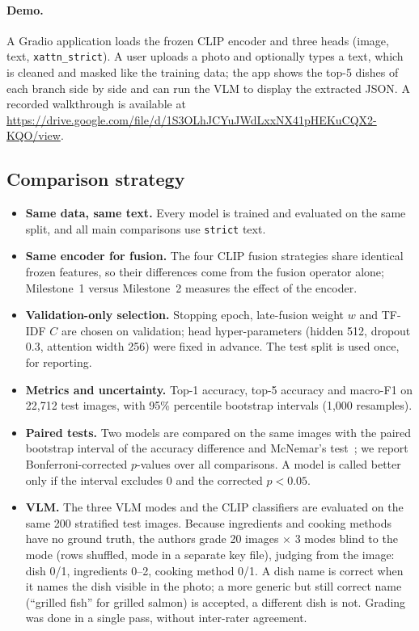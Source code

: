 \documentclass[11pt,a4paper]{article}
\begin{document}
\paragraph{Demo.}
A Gradio application loads the frozen CLIP encoder and three heads (image, text, \texttt{xattn\_strict}). A user
uploads a photo and optionally types a text, which is cleaned and masked like the training data; the app shows the
top-5 dishes of each branch side by side and can run the VLM to display the extracted JSON. A recorded walkthrough
is available at \url{https://drive.google.com/file/d/1S3OLhJCYuJWdLxxNX41pHEKuCQX2-KQO/view}.

\subsection{Comparison strategy}
\label{sec:comparison}

\begin{itemize}
  \item \textbf{Same data, same text.} Every model is trained and evaluated on the same split, and all main
        comparisons use \texttt{strict} text.
  \item \textbf{Same encoder for fusion.} The four CLIP fusion strategies share identical frozen features, so their
        differences come from the fusion operator alone; Milestone~1 versus Milestone~2 measures the effect of the
        encoder.
  \item \textbf{Validation-only selection.} Stopping epoch, late-fusion weight $w$ and TF-IDF $C$ are chosen on
        validation; head hyper-parameters (hidden 512, dropout 0.3, attention width 256) were fixed in advance. The
        test split is used once, for reporting.
  \item \textbf{Metrics and uncertainty.} Top-1 accuracy, top-5 accuracy and macro-F1 on 22,712 test images,
        with 95\% percentile bootstrap intervals (1,000 resamples).
  \item \textbf{Paired tests.} Two models are compared on the same images with the paired bootstrap interval of
        the accuracy difference and McNemar's test~\cite{mcnemar1947}; we report Bonferroni-corrected $p$-values
        over all comparisons. A model is called better only if the interval excludes 0 and the corrected $p<0.05$.
  \item \textbf{VLM.} The three VLM modes and the CLIP classifiers are evaluated on the same 200 stratified test
        images. Because ingredients and cooking methods have no ground truth, the authors grade 20 images
        $\times$ 3 modes blind to the mode (rows shuffled, mode in a separate key file), judging from the image:
        dish 0/1, ingredients 0--2, cooking method 0/1. A dish name is correct when it names the dish visible in
        the photo; a more generic but still correct name (``grilled fish'' for grilled salmon) is accepted, a
        different dish is not. Grading was done in a single pass, without inter-rater agreement.
\end{itemize}
\end{document}
